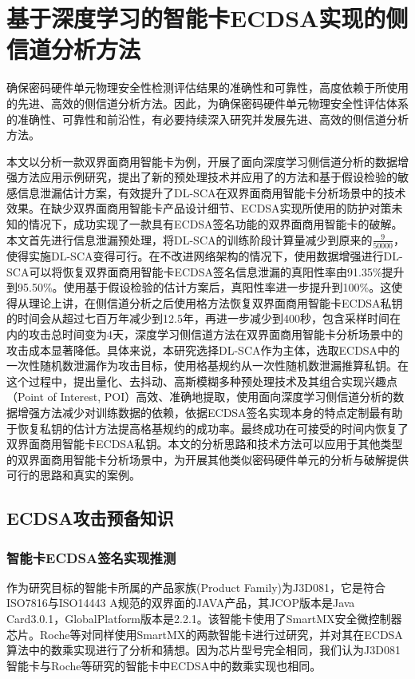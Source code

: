 \chapter{基于深度学习的智能卡ECDSA实现的侧信道分析方法}\label{chap:search2}{
	确保密码硬件单元物理安全性检测评估结果的准确性和可靠性，高度依赖于所使用的先进、高效的侧信道分析方法。因此，为确保密码硬件单元物理安全性评估体系的准确性、可靠性和前沿性，有必要持续深入研究并发展先进、高效的侧信道分析方法。
	
	本文以分析一款双界面商用智能卡为例，开展了面向深度学习侧信道分析的数据增强方法应用示例研究，提出了新的预处理技术并应用了的方法和基于假设检验的敏感信息泄漏估计方案，有效提升了DL-SCA在双界面商用智能卡分析场景中的技术效果。在缺少双界面商用智能卡产品设计细节、ECDSA实现所使用的防护对策未知的情况下，成功实现了一款具有ECDSA签名功能的双界面商用智能卡的破解。本文首先进行信息泄漏预处理，将DL-SCA的训练阶段计算量减少到原来的$\frac{9}{50000}$，使得实施DL-SCA变得可行。在不改进网络架构的情况下，使用数据增强进行DL-SCA可以将恢复双界面商用智能卡ECDSA签名信息泄漏的真阳性率由91.35\%提升到95.50\%。使用基于假设检验的估计方案后，真阳性率进一步提升到100\%。这使得从理论上讲，在侧信道分析之后使用格方法恢复双界面商用智能卡ECDSA私钥的时间会从超过七百万年减少到12.5年，再进一步减少到400秒，包含采样时间在内的攻击总时间变为4天，深度学习侧信道方法在双界面商用智能卡分析场景中的攻击成本显著降低。具体来说，本研究选择DL-SCA作为主体，选取ECDSA中的一次性随机数泄漏作为攻击目标，使用格基规约从一次性随机数泄漏推算私钥。在这个过程中，提出量化、去抖动、高斯模糊多种预处理技术及其组合实现兴趣点（Point of Interest, POI）高效、准确地提取，使用面向深度学习侧信道分析的数据增强方法减少对训练数据的依赖，依据ECDSA签名实现本身的特点定制最有助于恢复私钥的估计方法提高格基规约的成功率。最终成功在可接受的时间内恢复了双界面商用智能卡ECDSA私钥。本文的分析思路和技术方法可以应用于其他类型的双界面商用智能卡分析场景中，为开展其他类似密码硬件单元的分析与破解提供可行的思路和真实的案例。
	\section{ECDSA攻击预备知识}\label{sec:vulnerable}
	\subsection{智能卡ECDSA签名实现推测}
	
	作为研究目标的智能卡所属的产品家族(Product Family)为J3D081，它是符合ISO7816\citep{ISO/IEC7816}与ISO14443 A\citep{ISO/IEC14443}规范的双界面的JAVA产品，其JCOP版本是Java Card3.0.1，GlobalPlatform版本是2.2.1。该智能卡使用了SmartMX\citep{p5x}安全微控制器芯片。Roche等\citep{Roche21}对同样使用SmartMX的两款智能卡进行过研究，并对其在ECDSA算法中的数乘实现进行了分析和猜想。因为芯片型号完全相同，我们认为J3D081智能卡与Roche等\citep{Roche21}研究的智能卡中ECDSA中的数乘实现也相同。
	
}
